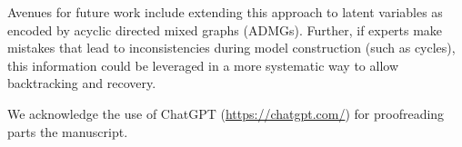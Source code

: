 \documentclass[accepted]{uai2025} %
\begin{document}
Avenues for future work include extending this approach to latent variables 
as encoded by acyclic directed mixed graphs (ADMGs). Further, if experts make 
mistakes that lead to inconsistencies during model construction (such as cycles),
this information could be leveraged in a more systematic way to allow backtracking
and recovery.

\begin{acknowledgements} 
	We acknowledge the use of ChatGPT (\url{https://chatgpt.com/}) for
	proofreading parts the manuscript.
\end{acknowledgements}



\newpage


\end{document}
